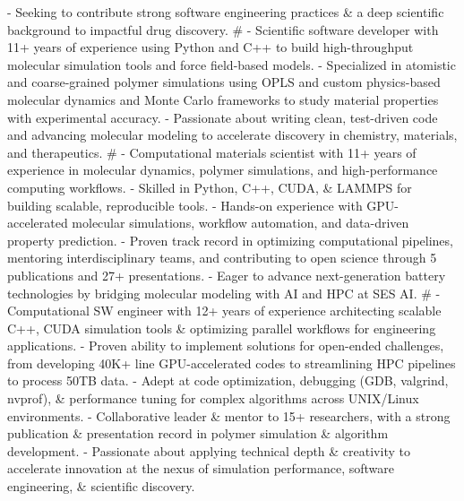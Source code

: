 - Seeking to contribute strong software engineering practices \& a deep scientific background to impactful drug discovery.
#
- Scientific software developer with 11+ years of experience using Python and C++ to build high-throughput molecular simulation tools and force field-based models.
- Specialized in atomistic and coarse-grained polymer simulations using OPLS and custom physics-based molecular dynamics and Monte Carlo frameworks to study material properties with experimental accuracy.
- Passionate about writing clean, test-driven code and advancing molecular modeling to accelerate discovery in chemistry, materials, and therapeutics.
#
- Computational materials scientist with 11+ years of experience in molecular dynamics, polymer simulations, and high-performance computing workflows.
- Skilled in Python, C++, CUDA, \& LAMMPS for building scalable, reproducible tools.
- Hands-on experience with GPU-accelerated molecular simulations, workflow automation, and data-driven property prediction.
- Proven track record in optimizing computational pipelines, mentoring interdisciplinary teams, and contributing to open science through 5 publications and 27+ presentations.
- Eager to advance next-generation battery technologies by bridging molecular modeling with AI and HPC at SES AI.
#
- Computational SW engineer with 12+ years of experience architecting scalable C++, CUDA simulation tools \& optimizing parallel workflows for engineering applications.
- Proven ability to implement solutions for open-ended challenges, from developing 40K+ line GPU-accelerated codes to streamlining HPC pipelines to process 50TB data.
- Adept at code optimization, debugging (GDB, valgrind, nvprof), \& performance tuning for complex algorithms across UNIX/Linux environments.
- Collaborative leader \& mentor to 15+ researchers, with a strong publication \& presentation record in polymer simulation \& algorithm development.
- Passionate about applying technical depth \& creativity to accelerate innovation at the nexus of simulation performance, software engineering, \& scientific discovery.
